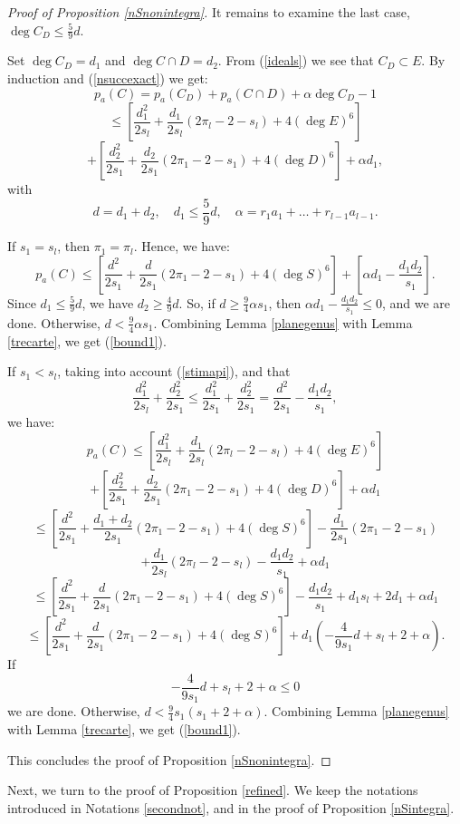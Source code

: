 \documentclass[9pt,a4paper]{amsart}
\theoremstyle{plain}
\theoremstyle{definition}
\theoremstyle{remark}
\begin{document}
\begin{proof}[Proof of Proposition \ref{nSnonintegra}]
\smallskip
It remains to examine the last case, $\deg C_D\leq \frac{5}{9}d$.

Set $\deg C_D=d_1$ and $\deg C\cap D=d_2$. From (\ref{ideals}) we
see that $C_D\subset E$. By induction and (\ref{nsuccexact}) we get:
$$
p_a(C)=p_a(C_D)+p_a(C\cap D)+\alpha\deg C_D-1
$$
$$
\leq \left[\frac{d_1^2}{2s_l}+\frac{d_1}{2s_l}(2\pi_l-2-s_l)+4(\deg
E)^6\right]
$$
$$
+ \left[\frac{d_2^2}{2s_1}+\frac{d_2}{2s_1}(2\pi_1-2-s_1)+4(\deg
D)^6\right]+\alpha d_1,
$$
with
$$
d=d_1+d_2,\quad d_1\leq \frac{5}{9}d, \quad
\alpha=r_1a_1+\dots+r_{l-1}a_{l-1}.
$$

\smallskip
If $s_1=s_l$, then $\pi_1=\pi_l$. Hence, we have:
\begin{equation}\label{cd1}
p_a(C)\leq
\left[\frac{d^2}{2s_1}+\frac{d}{2s_1}(2\pi_1-2-s_1)+4(\deg
S)^6\right] +\left[\alpha d_1-\frac{d_1d_2}{s_1}\right].
\end{equation}
Since $d_1\leq \frac{5}{9}d$, we have $d_2\geq \frac{4}{9}d$. So,
if $d\geq \frac{9}{4}\alpha s_1$, then $\alpha
d_1-\frac{d_1d_2}{s_1}\leq 0$, and we are done. Otherwise, $d<
\frac{9}{4}\alpha s_1$. Combining Lemma \ref{planegenus} with Lemma
\ref{trecarte}, we get (\ref{bound1}).

\smallskip
If $s_1<s_l$, taking into account (\ref{stimapi}), and that
$$
\frac{d_1^2}{2s_l}+\frac{d_2^2}{2s_1}\leq
\frac{d_1^2}{2s_1}+\frac{d_2^2}{2s_1}=
\frac{d^2}{2s_1}-\frac{d_1d_2}{s_1},
$$
we have:
\begin{equation}\label{cd2}
p_a(C)\leq
\left[\frac{d_1^2}{2s_l}+\frac{d_1}{2s_l}(2\pi_l-2-s_l)+4(\deg
E)^6\right]
\end{equation}
$$+
\left[\frac{d_2^2}{2s_1}+\frac{d_2}{2s_1}(2\pi_1-2-s_1)+4(\deg
D)^6\right]+\alpha d_1
$$
$$
\leq
\left[\frac{d^2}{2s_1}+\frac{d_1+d_2}{2s_1}(2\pi_1-2-s_1)+4(\deg
S)^6\right]- \frac{d_1}{2s_1}(2\pi_1-2-s_1)
$$
$$
+\frac{d_1}{2s_l}(2\pi_l-2-s_l) -\frac{d_1d_2}{s_1}+\alpha d_1
$$
$$
\leq \left[\frac{d^2}{2s_1}+\frac{d}{2s_1}(2\pi_1-2-s_1)+4(\deg
S)^6\right] -\frac{d_1d_2}{s_1}+d_1s_l+2d_1 +\alpha d_1
$$
$$
\leq \left[\frac{d^2}{2s_1}+\frac{d}{2s_1}(2\pi_1-2-s_1)+4(\deg
S)^6\right]+d_1\left(-\frac{4}{9s_1}d+s_l+2+\alpha \right).
$$
If
$$
-\frac{4}{9s_1}d+s_l+2+\alpha\leq 0
$$
we are done. Otherwise, $d< \frac{9}{4}s_1(s_1+2+\alpha)$. Combining
Lemma \ref{planegenus} with Lemma \ref{trecarte}, we get
(\ref{bound1}).

\smallskip
This concludes the proof of Proposition \ref{nSnonintegra}.
\end{proof}

\smallskip
Next, we turn to the proof of Proposition \ref{refined}. We keep the
notations introduced in Notations \ref{secondnot}, and in the proof
of Proposition \ref{nSintegra}.
\end{document}
